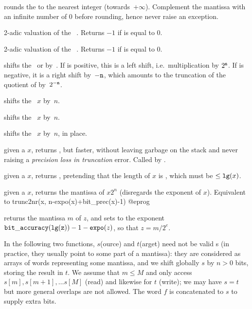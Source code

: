  rounds the   to the nearest
integer (towards~$+\infty$). Complement the mantissa with an infinite number
of $0$ before rounding, hence never raise an exception.


 2-adic valuation of the ~. Returns
$-1$ if  is equal to 0.

 2-adic valuation of the ~. Returns $-1$
if  is equal to 0.

 shifts the~ or
  by~. If  is positive, this is a left shift,
i.e.~multiplication by $2^{{\tt n}}$. If  is negative, it is a right
shift by~$-{\tt n}$, which amounts to the truncation of the quotient of 
by~$2^{-{\tt n}}$.

 shifts the ~$x$ by~$n$.

 shifts the ~$x$ by~$n$.

 shifts the ~$x$ by~$n$,
in place.

 given a  $x$, returns
, but faster, without leaving garbage on the stack
and never raising a \emph{precision loss in truncation} error.
Called by .

 given a  $x$, returns
, pretending that the length of $x$ is , which
must be $\leq {\tt lg}(x)$.

 given a  $x$, returns
the mantissa of $x 2^n$ (disregards the exponent of $x$). Equivalent to
\bprog
  trunc2nr(x, n-expo(x)+bit_prec(x)-1)
@eprog

 returns the mantissa $m$ of $z$, and
sets  to the exponent ${\tt bit\_accuracy(lg(z))}-1-{\tt expo}(z)$,
so that $z = m / 2^e$.

 In the following two functions, $s$(ource) and $t$(arget)
need not be valid s (in practice, they usually point to some part of a
 mantissa): they are considered as arrays of words representing some
mantissa, and we shift globally $s$ by $n > 0$ bits, storing the result in
$t$. We assume that $m\leq M$ and only access $s[m], s[m+1],\ldots s[M]$
(read) and likewise for $t$ (write); we may have $s = t$ but more general
overlaps are not allowed. The word $f$ is concatenated to $s$ to supply extra
bits.

